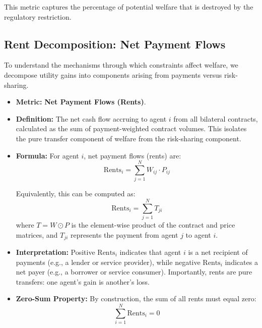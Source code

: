 This metric captures the percentage of potential welfare that is destroyed by the regulatory restriction.

\subsection{Rent Decomposition: Net Payment Flows}

To understand the mechanisms through which constraints affect welfare, we decompose utility gains into components arising from payments versus risk-sharing.

\begin{itemize}
    \item \textbf{Metric:} \textbf{Net Payment Flows (Rents)}.
    
    \item \textbf{Definition:} The net cash flow accruing to agent $i$ from all bilateral contracts, calculated as the sum of payment-weighted contract volumes. This isolates the pure transfer component of welfare from the risk-sharing component.
    
    \item \textbf{Formula:} For agent $i$, net payment flows (rents) are:
    \begin{equation}
    \text{Rents}_i = \sum_{j=1}^N W_{ij} \cdot P_{ij}
    \label{eq:rents}
    \end{equation}
    
    Equivalently, this can be computed as:
    \begin{equation}
    \text{Rents}_i = \sum_{j=1}^N T_{ji}
    \end{equation}
    where $T = W \odot P$ is the element-wise product of the contract and price matrices, and $T_{ji}$ represents the payment from agent $j$ to agent $i$.
    
    \item \textbf{Interpretation:} Positive $\text{Rents}_i$ indicates that agent $i$ is a net recipient of payments (e.g., a lender or service provider), while negative $\text{Rents}_i$ indicates a net payer (e.g., a borrower or service consumer). Importantly, rents are pure transfers: one agent's gain is another's loss.
    
    \item \textbf{Zero-Sum Property:} By construction, the sum of all rents must equal zero:
    \begin{equation}
    \sum_{i=1}^N \text{Rents}_i = 0
    \end{equation}
    

\end{itemize}
